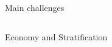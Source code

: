 \documentclass[final]{beamer}
\newcounter{acolumn}%
\def\autoheight{\vspace*{0pt}}%
\begin{document}
\begin{frame}
\begin{acolumns}[t]
\begin{column}{.24\linewidth}
\begin{block}{Main challenges}
                            \autoheight 
                          \end{block}
                          
                        
        \end{column}
                        
          
        
    
  
              \begin{column}{.48\linewidth}
              
                
             
                \begin{block}{Economy and Stratification}
                	
                 \begin{figure}
                 \centering
                 

\end{figure}
\end{block}
\end{column}
\end{acolumns}
\end{frame}
\end{document}
